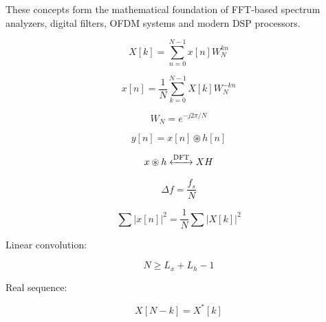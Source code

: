 These concepts form the mathematical foundation of FFT-based spectrum analyzers,
digital filters, OFDM systems and modern DSP processors.


\begin{tcolorbox}[title=One-Minute Revision,colback=blue!5]

\[
X[k]=
\sum_{n=0}^{N-1}x[n]W_N^{kn}
\]

\[
x[n]=
\frac{1}{N}
\sum_{k=0}^{N-1}X[k]W_N^{-kn}
\]

\[
W_N=e^{-j2\pi/N}
\]

\[
y[n]=x[n]\circledast h[n]
\]

\[
x\circledast h
\xleftrightarrow{\text{DFT}}
XH
\]

\[
\Delta f=\frac{f_s}{N}
\]

\[
\sum |x[n]|^2=
\frac{1}{N}\sum |X[k]|^2
\]

Linear convolution:

\[
N\ge L_x+L_h-1
\]

Real sequence:

\[
X[N-k]=X^*[k]
\]

\end{tcolorbox}
